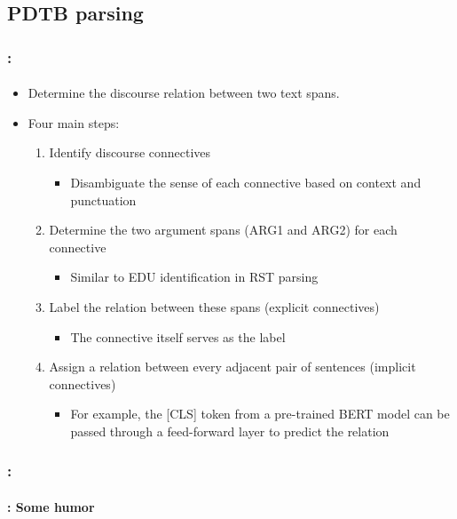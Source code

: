 \documentclass[xcolor=table]{beamer}
\begin{document}
\subsection{PDTB parsing}

\begin{frame}
	\frametitle{\insertshortsubtitle: \insertsection}
	\framesubtitle{\insertsubsection}
	
	\begin{itemize}
		\item Determine the discourse relation between two text spans.
		\item Four main steps: 
		\begin{enumerate}
			\item Identify discourse connectives
			\begin{itemize}
				\item Disambiguate the sense of each connective based on context and punctuation
			\end{itemize}
			\item Determine the two argument spans (ARG1 and ARG2) for each connective
			\begin{itemize}
				\item Similar to EDU identification in RST parsing
			\end{itemize}
			\item Label the relation between these spans (explicit connectives)
			\begin{itemize}
				\item The connective itself serves as the label
			\end{itemize}
			\item Assign a relation between every adjacent pair of sentences (implicit connectives)
			\begin{itemize}
				\item For example, the [CLS] token from a pre-trained BERT model can be passed through a feed-forward layer to predict the relation
			\end{itemize}
		\end{enumerate}
	\end{itemize}
	
\end{frame}


\begin{frame}
	\frametitle{\insertshortsubtitle: \insertsection}
	\framesubtitle{\insertsubsection: Some humor}
	
	\begin{center}
	\end{center}
	
\end{frame}
\end{document}
